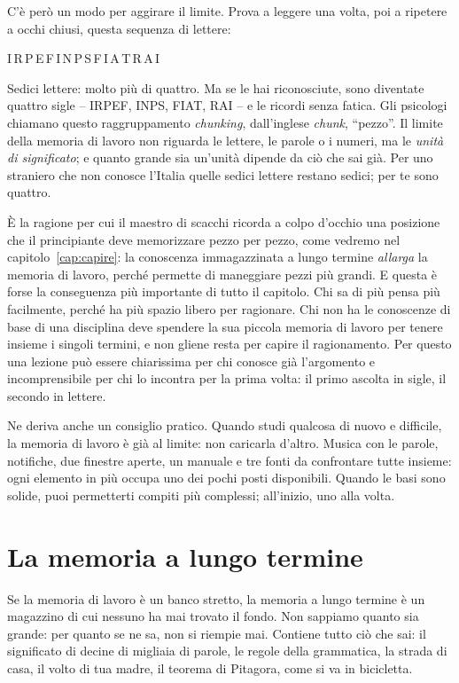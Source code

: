 C'è però un modo per aggirare il limite. Prova a leggere una volta, poi
a ripetere a occhi chiusi, questa sequenza di lettere:

\begin{center}
\cifremaiuscole I\,R\,P\,E\,F\,I\,N\,P\,S\,F\,I\,A\,T\,R\,A\,I
\end{center}

Sedici lettere: molto più di quattro. Ma se le hai riconosciute, sono
diventate quattro sigle -- IRPEF, INPS, FIAT, RAI -- e le ricordi
senza fatica. Gli psicologi chiamano questo raggruppamento
\emph{chunking}, dall'inglese \emph{chunk}, \enquote{pezzo}. Il limite
della memoria di lavoro non riguarda le lettere, le parole o i numeri,
ma le \emph{unità di significato}; e quanto grande sia un'unità dipende
da ciò che sai già. Per uno straniero che non conosce l'Italia quelle
sedici lettere restano sedici; per te sono quattro.

È la ragione per cui il maestro di scacchi ricorda a colpo d'occhio una
posizione che il principiante deve memorizzare pezzo per pezzo, come
vedremo nel capitolo~\ref{cap:capire}: la conoscenza immagazzinata a
lungo termine \emph{allarga} la memoria di lavoro, perché permette di
maneggiare pezzi più grandi. E questa è forse la conseguenza più
importante di tutto il capitolo. Chi sa di più pensa più facilmente,
perché ha più spazio libero per ragionare. Chi non ha le conoscenze di
base di una disciplina deve spendere la sua piccola memoria di lavoro
per tenere insieme i singoli termini, e non gliene resta per capire il
ragionamento. Per questo una lezione può essere chiarissima per chi
conosce già l'argomento e incomprensibile per chi lo incontra per la
prima volta: il primo ascolta in sigle, il secondo in lettere.

Ne deriva anche un consiglio pratico. Quando studi qualcosa di nuovo e
difficile, la memoria di lavoro è già al limite: non caricarla d'altro.
Musica con le parole, notifiche, due finestre aperte, un manuale e tre
fonti da confrontare tutte insieme: ogni elemento in più occupa uno dei
pochi posti disponibili. Quando le basi sono solide, puoi permetterti
compiti più complessi; all'inizio, uno alla volta.

\section{La memoria a lungo termine}

Se la memoria di lavoro è un banco stretto, la memoria a lungo termine
è un magazzino di cui nessuno ha mai trovato il fondo. Non sappiamo
quanto sia grande: per quanto se ne sa, non si riempie mai. Contiene
tutto ciò che sai: il significato di decine di migliaia di parole, le
regole della grammatica, la strada di casa, il volto di tua madre, il
teorema di Pitagora, come si va in bicicletta.

